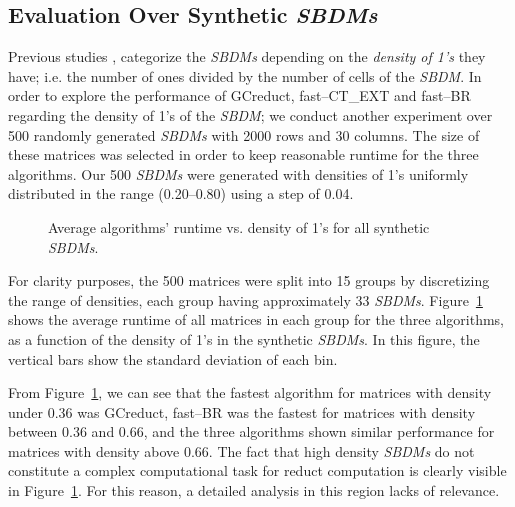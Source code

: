 \documentclass[authoryear,11pt]{elsarticle}
\begin{document}
\subsection{Evaluation Over Synthetic \textit{SBDMs}}\label{sub:synth}

  Previous studies \citep{Rojas12,Lias13,Rodriguez15}, categorize the \textit{SBDMs} depending on the \emph{density of 1's} they have; i.e. the number of ones divided by the number of cells of the \textit{SBDM}. In order to explore the performance of GCreduct, fast--CT\_EXT and fast--BR regarding the density of 1's of the \textit{SBDM}; we conduct another experiment over 500 randomly generated \textit{SBDMs} with 2000 rows and 30 columns. The size of these matrices was selected in order to keep reasonable runtime for the three algorithms. Our 500 \textit{SBDMs} were generated with densities of 1's uniformly distributed in the range (0.20--0.80) using a step of 0.04. 

\begin{figure}[htb]
	\begin{center}
	\end{center}
	\caption{Average algorithms' runtime vs. density of 1's for all synthetic \textit{SBDMs}.}
	\label{fig:scattDensity}
\end{figure}	

  For clarity purposes, the 500 matrices were split into 15 groups by discretizing the range of densities, each group having approximately 33 \textit{SBDMs}. Figure~\ref{fig:scattDensity} shows the average runtime of all  matrices in each group for the three algorithms, as a function of the density of 1's in the synthetic \textit{SBDMs}. In this figure, the vertical bars show the standard deviation of each bin. 

  From Figure~\ref{fig:scattDensity}, we can see that the fastest algorithm for matrices with density under 0.36 was GCreduct, fast--BR was the fastest for matrices with density between 0.36 and 0.66, and the three algorithms shown similar performance for matrices with density above 0.66. The fact that high density \textit{SBDMs} do not constitute a complex computational task for reduct computation \citep{Rojas12} is clearly visible in Figure~\ref{fig:scattDensity}. For this reason, a detailed analysis in this region lacks of relevance.
\end{document}
